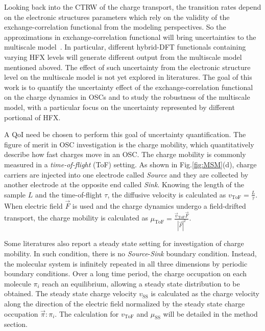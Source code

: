 \documentclass[%
 reprint,
superscriptaddress,
 amsmath,amssymb,
 aps,
prb,
floatfix
]{revtex4-2}
\begin{document}
Looking back into the CTRW of the charge transport, the transition rates depend on the electronic structures parameters which rely on the validity of the exchange-correlation functional from the modeling perspectives.
So the approximations in exchange-correlation functional will bring uncertainties to the multiscale model~\cite{medvedev_density_2017}. 
In particular, different hybrid-DFT functionals containing varying HFX levels will generate different output from the multiscale model mentioned aboved. 
The effect of such uncertainty from the electronic structure level on the multiscale model is not yet explored in literatures. 
The goal of this work is to quantify the uncertainty effect of the exchange-correlation functional on the charge dynamics in OSCs and to study the robustness of the multiscale model, with a particular focus on the uncertainty represented by different portional of HFX.

A QoI need be chosen to perform this goal of uncertainty quantification. 
The figure of merit in OSC investigation is the charge mobility, which quantitatively describe how fast charges move in an OSC. 
The charge mobility is commonly measured in a \textit{time-of-flight} (ToF) setting. 
As shown in Fig.\ref{fig:MSM}(d), charge carriers are injected into one electrode called \textit{Source} and they are collected by another electrode at the opposite end called \textit{Sink}. 
Knowing the length of the sample $L$ and the time-of-flight $\tau$, the diffusive velocity is calculated as $v_\text{ToF}=\frac{L}{\tau}$.
When electric field $\vec{F}$ is used and the charge dynamics undergo a field-drifted transport, the charge mobility is calculated as $\mu_\text{ToF}=\frac{\vec{v}_\text{ToF} \vec{F}}{|\vec{F}|^2}$. 

Some literatures also report a steady state setting for investigation of charge mobility. In such condition, there is no \textit{Source}-\textit{Sink} boundary condition. Instead, the molecular system is infinitely repeated in all three dimensions by periodic boundary conditions. 
Over a long time period, the charge occupation on each molecule $\pi_i$ reach an equilibrium, allowing a steady state distribution to be obtained.
The steady state charge velocity $v_\text{SS}$ is calculated as the charge velocity along the direction of the electric field normalized by the steady state charge occupation $\vec{\pi}:\pi_i$. 
The calculation for $v_\text{ToF}$ and $\mu_\text{SS}$ will be detailed in the method section.
\end{document}
